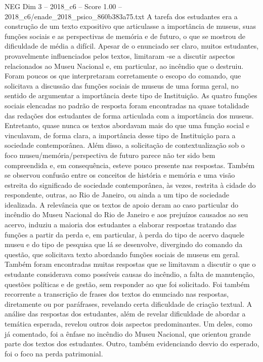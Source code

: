 \begin{textsample}{NEG Dim 3 – 2018\_c6 – Score 1.00 – 2018\_c6/enade\_2018\_psico\_860b383a75.txt}
A tarefa dos estudantes era a construção de um texto expositivo que articulasse a importância de museus, suas funções sociais e as perspectivas de memória e de futuro, o que se mostrou de dificuldade de média a difícil.
Apesar de o enunciado ser claro, muitos estudantes, provavelmente influenciados pelos textos, limitaram -se a discutir aspectos relacionados ao Museu Nacional e, em particular, ao incêndio que o destruiu.
Foram poucos os que interpretaram corretamente o escopo do comando, que solicitava a discussão das funções sociais de museus de uma forma geral, no sentido de argumentar a importância deste tipo de Instituição.
As quatro funções sociais elencadas no padrão de resposta foram encontradas na quase totalidade das redações dos estudantes de forma articulada com a importância dos museus.
Entretanto, quase nunca os textos abordavam mais do que uma função social e vinculavam, de forma clara, a importância desse tipo de Instituição para a sociedade contemporânea.
Além disso, a solicitação de contextualização sob o foco museu/memória/perspectiva de futuro parece não ter sido bem compreendida e, em consequência, esteve pouco presente nas respostas.
Também se observou confusão entre os conceitos de história e memória e uma visão estreita do significado de sociedade contemporânea, às vezes, restrita à cidade do respondente, outras, ao Rio de Janeiro, ou ainda a um tipo de sociedade idealizada.
A relevância que os textos de apoio deram ao caso particular do incêndio do Museu Nacional do Rio de Janeiro e aos prejuízos causados ao seu acervo, induziu a maioria dos estudantes a elaborar respostas tratando das funções a partir da perda e, em particular, à perda do tipo de acervo daquele museu e do tipo de pesquisa que lá se desenvolve, divergindo do comando da questão, que solicitava texto abordando funções sociais de museus em geral.
Também foram encontradas muitas respostas que se limitavam a discutir o que o estudante considerava como possíveis causas do incêndio, a falta de manutenção, questões políticas e de gestão, sem responder ao que foi solicitado.
Foi também recorrente a transcrição de frases dos textos do enunciado nas respostas, diretamente ou por paráfrases, revelando certa dificuldade de criação textual.
A análise das respostas dos estudantes, além de revelar dificuldade de abordar a temática esperada, revelou outros dois aspectos predominantes.
Um deles, como já comentado, foi a ênfase no incêndio do Museu Nacional, que orientou grande parte dos textos dos estudantes.
Outro, também evidenciando desvio do esperado, foi o foco na perda patrimonial.

\end{textsample}

